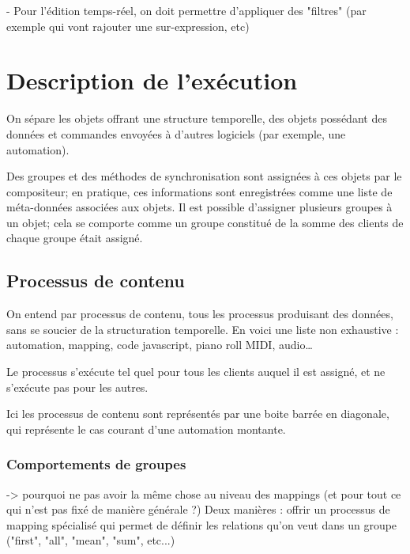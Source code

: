 \documentclass{article}
\begin{document}
- Pour l'édition temps-réel, on doit permettre d'appliquer des "filtres" (par exemple qui vont rajouter une sur-expression, etc)

\section{Description de l'exécution}\label{sec.description}
On sépare les objets offrant une structure temporelle, des objets possédant des données et commandes envoyées à d'autres logiciels (par exemple, une automation).

Des groupes et des méthodes de synchronisation sont assignées à ces objets par le compositeur; en pratique, ces informations sont enregistrées comme une liste de méta-données associées aux objets.
Il est possible d'assigner plusieurs groupes à un objet; cela se comporte comme un groupe constitué de la somme des clients de chaque groupe était assigné.

\subsection{Processus de contenu}
On entend par processus de contenu, tous les processus produisant des données, sans se soucier de la structuration temporelle. En voici une liste non exhaustive : automation, mapping, code javascript, piano roll MIDI, audio\dots

Le processus s'exécute tel quel pour tous les clients auquel il est assigné, 
et ne s'exécute pas pour les autres.

Ici les processus de contenu sont représentés par une boite barrée en diagonale, qui représente le cas courant d'une automation montante.

\subsubsection{Comportements de groupes}
-> pourquoi ne pas avoir la même chose au niveau des mappings (et pour tout ce qui n'est pas fixé de manière générale ?)
Deux manières : offrir un processus de mapping spécialisé qui permet de définir les relations qu'on veut dans un groupe ("first", "all", "mean", "sum", etc...)
\end{document}
